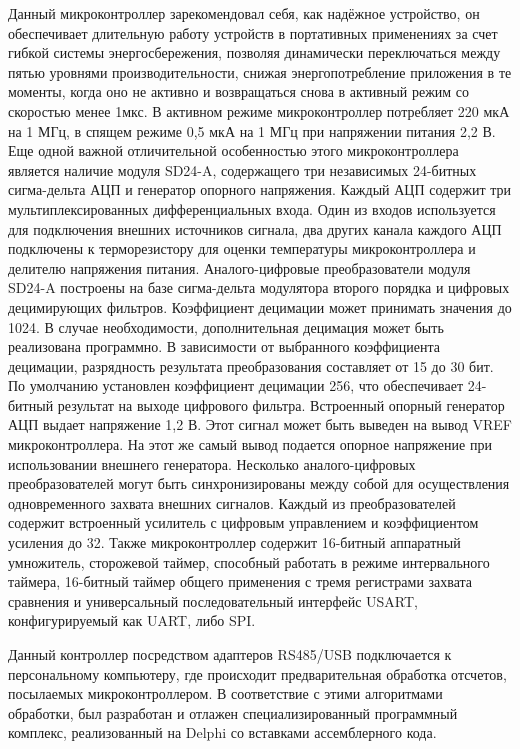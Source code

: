 Данный микроконтроллер зарекомендовал себя, как надёжное устройство, он обеспечивает длительную работу устройств в портативных применениях за счет гибкой системы энергосбережения, позволяя динамически переключаться между пятью уровнями производительности, снижая энергопотребление приложения в те моменты, когда оно не активно и возвращаться снова в активный режим со скоростью менее 1мкс. В активном режиме микроконтроллер потребляет 220 мкА на 1 МГц, в спящем режиме 0,5 мкА на 1 МГц при напряжении питания 2,2 В. Еще одной важной отличительной особенностью этого микроконтроллера является наличие модуля SD24-A, содержащего три независимых 24-битных сигма-дельта АЦП и генератор опорного напряжения. Каждый АЦП содержит три мультиплексированных дифференциальных входа. Один из входов используется для подключения внешних источников сигнала, два других канала каждого АЦП подключены к терморезистору для оценки температуры микроконтроллера и делителю напряжения питания. Аналого-цифровые преобразователи модуля SD24-A построены на базе сигма-дельта модулятора второго порядка и цифровых децимирующих фильтров. Коэффициент децимации может принимать значения до 1024. В случае необходимости, дополнительная децимация может быть реализована программно. В зависимости от выбранного коэффициента децимации, разрядность результата преобразования составляет от 15 до 30 бит. По умолчанию установлен коэффициент децимации 256, что обеспечивает 24-битный результат на выходе цифрового фильтра. Встроенный опорный генератор АЦП выдает напряжение 1,2 В. Этот сигнал может быть выведен на вывод VREF микроконтроллера. На этот же самый вывод подается опорное напряжение при использовании внешнего генератора. Несколько аналого-цифровых преобразователей могут быть синхронизированы между собой для осуществления одновременного захвата внешних сигналов. Каждый из преобразователей содержит встроенный усилитель с цифровым управлением и коэффициентом усиления до 32. Также микроконтроллер содержит 16-битный аппаратный умножитель, сторожевой таймер, способный работать в режиме интервального таймера, 16-битный таймер общего применения с тремя регистрами захвата сравнения и универсальный последовательный интерфейс USART, конфигурируемый как UART, либо SPI.

Данный контроллер посредством адаптеров RS485/USB подключается к персональному компьютеру, где происходит предварительная обработка отсчетов, посылаемых микроконтроллером. В соответствие с этими алгоритмами обработки, был разработан и отлажен специализированный программный комплекс, реализованный на Delphi со вставками ассемблерного кода.

